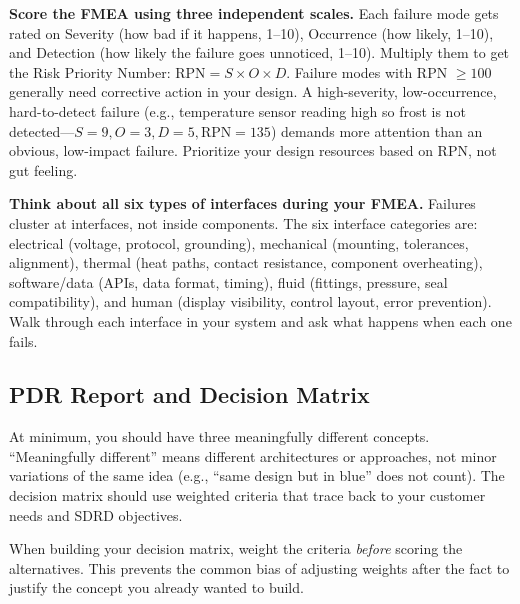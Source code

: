 \documentclass[11pt,letterpaper]{article}
\begin{document}
\begin{tipbox}
\textbf{Score the FMEA using three independent scales.} Each failure mode gets rated on Severity (how bad if it happens, 1--10), Occurrence (how likely, 1--10), and Detection (how likely the failure goes unnoticed, 1--10). Multiply them to get the Risk Priority Number: $\text{RPN} = S \times O \times D$. Failure modes with RPN $\geq 100$ generally need corrective action in your design. A high-severity, low-occurrence, hard-to-detect failure (e.g., temperature sensor reading high so frost is not detected---$S=9, O=3, D=5, \text{RPN}=135$) demands more attention than an obvious, low-impact failure. Prioritize your design resources based on RPN, not gut feeling.
\end{tipbox}

\begin{protip}
\textbf{Think about all six types of interfaces during your FMEA.} Failures cluster at interfaces, not inside components. The six interface categories are: electrical (voltage, protocol, grounding), mechanical (mounting, tolerances, alignment), thermal (heat paths, contact resistance, component overheating), software/data (APIs, data format, timing), fluid (fittings, pressure, seal compatibility), and human (display visibility, control layout, error prevention). Walk through each interface in your system and ask what happens when each one fails.
\end{protip}

\subsection{PDR Report and Decision Matrix}

\begin{faqbox}
At minimum, you should have three meaningfully different concepts. ``Meaningfully different'' means different architectures or approaches, not minor variations of the same idea (e.g., ``same design but in blue'' does not count). The decision matrix should use weighted criteria that trace back to your customer needs and SDRD objectives.
\end{faqbox}

\begin{tipbox}
When building your decision matrix, weight the criteria \textit{before} scoring the alternatives. This prevents the common bias of adjusting weights after the fact to justify the concept you already wanted to build.
\end{tipbox}
\end{document}

